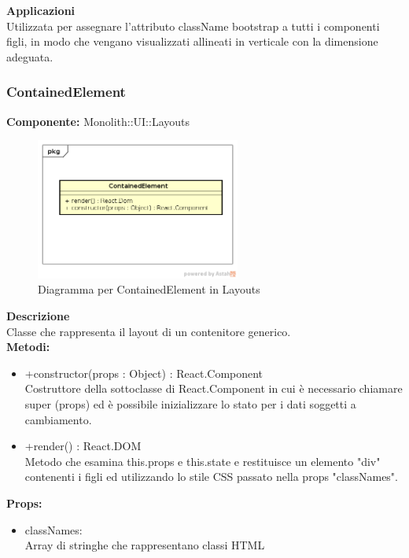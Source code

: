 \textbf{Applicazioni}\\
Utilizzata per assegnare l'attributo className bootstrap a tutti i componenti figli, in modo che vengano visualizzati allineati in verticale con la dimensione adeguata. 


\clearpage

\subsubsection{ContainedElement}
\textbf{Componente:}  Monolith::UI::Layouts\\
   \FloatBarrier
   \begin{figure}[ht]
   \centering
   \includegraphics[width=0.6\textwidth]{img/single-ContainedElement.png}
   \caption{{Diagramma per ContainedElement in Layouts}}
\end{figure}
\FloatBarrier
\textbf{Descrizione}\\
Classe che rappresenta il layout di un contenitore generico. \\
\textbf{Metodi:} 
\begin{itemize}

\item +constructor(props : Object) : React.Component 
\\
Costruttore della sottoclasse di React.Component in cui è necessario chiamare super (props) ed è possibile inizializzare lo stato per i dati soggetti a cambiamento.

\item +render() : React.DOM 
\\
Metodo che esamina this.props e this.state e restituisce un elemento "div" contenenti i figli ed utilizzando lo stile CSS passato nella props "classNames".

\end{itemize}

\textbf{Props:} 
\begin{itemize}

\item classNames: 
\\
Array di stringhe che rappresentano classi HTML

\end{itemize} 


